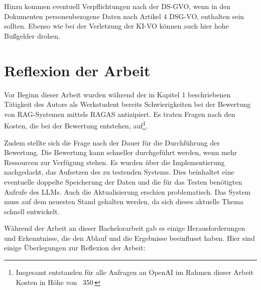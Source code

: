 Hinzu kommen eventuell Verpflichtungen nach der DS-GVO, wenn in den Dokumenten personenbezogene Daten nach Artikel 4 DSG-VO, enthalten sein sollten.
Ebenso wie bei der Verletzung der KI-VO können auch hier hohe Bußgelder drohen.

\section{Reflexion der Arbeit}

Vor Beginn dieser Arbeit wurden während der in Kapitel 1 beschriebenen Tätigkeit des Autors als Werkstudent bereits Schwierigkeiten bei der Bewertung von RAG-Systemen mittels RAGAS antizipiert.
Es traten Fragen nach den Kosten, die bei der Bewertung entstehen, auf\footnote{Insgesamt entstanden für alle Anfragen an OpenAI im Rahmen dieser Arbeit Kosten in Höhe von ~350\,\texteuro}.

Zudem stellte sich die Frage nach der Dauer für die Durchführung der Bewertung. Die Bewertung kann schneller durchgeführt werden, wenn mehr Ressourcen zur Verfügung stehen.
Es wurden über die Implementierung nachgedacht, das Aufsetzen des zu testenden Systems. Dies beinhaltet eine eventuelle doppelte Speicherung der Daten und die für das Testen benötigten Aufrufe des LLMs. %
Auch die Aktualisierung erschien problematisch. Das System muss auf dem neuesten Stand gehalten werden, da sich dieses aktuelle Thema schnell entwickelt.

Während der Arbeit an dieser Bachelorarbeit gab es einige Herausforderungen und Erkenntnisse, die den Ablauf und die Ergebnisse beeinflusst haben. Hier sind einige Überlegungen zur Reflexion der Arbeit:

